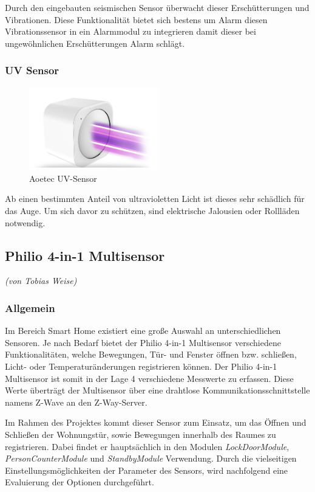 Durch den eingebauten seismischen Sensor überwacht dieser Erschütterungen und Vibrationen. Diese Funktionalität bietet sich bestens um Alarm diesen Vibrationssensor in ein Alarmmodul zu integrieren damit dieser bei ungewöhnlichen Erschütterungen Alarm schlägt.

\subsubsection{UV Sensor}
\begin{figure}[h!]
	\centering
	\includegraphics[width=0.5\textwidth]{img/Sensorevaluation/AeoUV.png}
	\caption{Aoetec UV-Sensor}
	\label{fig:sensorenAeoUV}
\end{figure}

Ab einen bestimmten Anteil von ultravioletten Licht ist dieses sehr schädlich für das Auge. Um sich davor zu schützen, sind elektrische Jalousien oder Rollläden notwendig.



\subsection{Philio 4-in-1 Multisensor}
\emph{(von Tobias Weise)}
\subsubsection{Allgemein}
Im Bereich Smart Home existiert eine große Auswahl an unterschiedlichen Sensoren. Je nach Bedarf bietet der Philio 4-in-1 Multisensor verschiedene Funktionalitäten, welche Bewegungen, Tür- und Fenster öffnen bzw. schließen, Licht- oder Temperaturänderungen registrieren können. Der Philio 4-in-1 Multisensor ist somit in der Lage 4 verschiedene Messwerte zu erfassen. Diese Werte überträgt der Multisensor über eine drahtlose Kommunikationsschnittstelle namens Z-Wave an den Z-Way-Server.

Im Rahmen des Projektes kommt dieser Sensor zum Einsatz, um das Öffnen und Schließen der Wohnungstür, sowie Bewegungen innerhalb des Raumes zu registrieren. Dabei findet er hauptsächlich in den Modulen \textit{LockDoorModule}, \textit{PersonCounterModule} und \textit{StandbyModule} Verwendung. Durch die vielseitigen Einstellungsmöglichkeiten der Parameter des Sensors, wird nachfolgend eine Evaluierung der Optionen durchgeführt.

